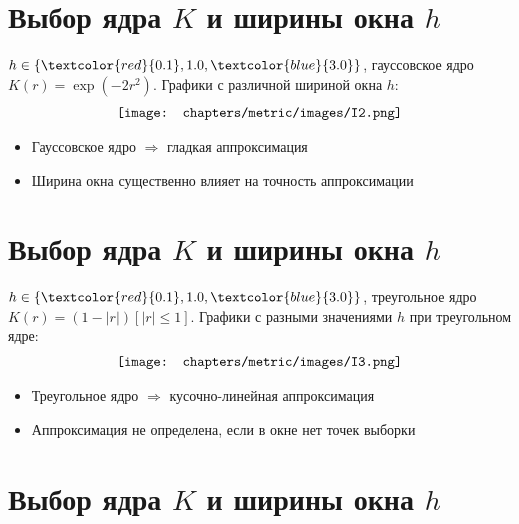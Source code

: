 \section*{Выбор ядра \(K\) и ширины окна \(h\)}

\noindent
\(h \in \{\textcolor{red}{0.1}, 1.0, \textcolor{blue}{3.0}\}\), гауссовское ядро \(K(r) = \exp(-2r^2)\).
Графики с различной шириной окна \(h\):
\begin{align*}
    \centering
    \texttt{[image: chapters/metric/images/I2.png]}
    \label{fig:kernel_choice}
\end{align*}

\begin{itemize}
    \item Гауссовское ядро \(\Rightarrow\) гладкая аппроксимация
    \item Ширина окна существенно влияет на точность аппроксимации
\end{itemize}

\section*{Выбор ядра \(K\) и ширины окна \(h\)}

\noindent
\(h \in \{\textcolor{red}{0.1}, 1.0, \textcolor{blue}{3.0}\}\), треугольное ядро \(K(r) = (1 - \lvert r \rvert) [{\lvert r \rvert \leq 1}]\). Графики с разными значениями \(h\) при треугольном ядре:
\begin{align*}
    \centering
    \texttt{[image: chapters/metric/images/I3.png]}
    \label{fig:kernel_triangle}
\end{align*}

\begin{itemize}
    \item Треугольное ядро \(\Rightarrow\) кусочно-линейная аппроксимация
    \item Аппроксимация не определена, если в окне нет точек выборки
\end{itemize}

\section*{Выбор ядра \(K\) и ширины окна \(h\)}

